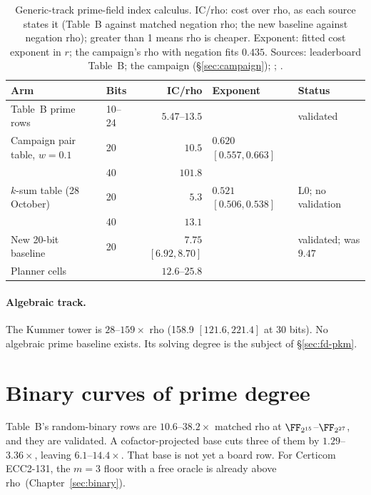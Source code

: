 \begin{table}[t]
\centering\small
\begin{tabular}{@{}llrll@{}}
\toprule
Arm & Bits & IC/rho & Exponent & Status \\
\midrule
Table~B prime rows & 10--24 & $5.47$--$13.5$ & & validated \\
\addlinespace
Campaign pair table, $w=0.1$ & 20 & $10.5$ & $0.620$ $[0.557,0.663]$ & \\
 & 40 & $101.8$ & & \\
\addlinespace
$k$-sum table (28 October) & 20 & $5.3$ & $0.521$ $[0.506,0.538]$ & L0; no validation \\
 & 40 & $13.1$ & & \\
\addlinespace
New 20-bit baseline & 20 & $7.75$ $[6.92,8.70]$ & & validated; was $9.47$ \\
\addlinespace
Planner cells & & $12.6$--$25.8$ & & \\
\bottomrule
\end{tabular}
\caption[]{Generic-track prime-field index calculus. IC/rho: cost over
rho, as each source states it (Table~B against matched negation rho; the
new baseline against negation rho); greater than 1 means rho is cheaper.
Exponent: fitted cost exponent in $r$; the campaign's rho with negation
fits $0.435$. Sources: leaderboard Table~B; the campaign
(\S\ref{sec:campaign}); ;
.}
\label{tab:distance-prime}
\end{table}

\paragraph{Algebraic track.} The Kummer tower is $28$--$159\times$ rho
(158.9 $[121.6,221.4]$ at 30 bits). No algebraic prime baseline exists.
Its solving degree is the subject of \S\ref{sec:fd-pkm}.

\section{Binary curves of prime degree}

Table~B's random-binary rows are $10.6$--$38.2\times$ matched rho at
$\FF_{2^{15}}$--$\FF_{2^{27}}$, and they are validated. A cofactor-projected
base cuts three of them by $1.29$--$3.36\times$, leaving $6.1$--$14.4\times$.
That base is not yet a board row. For Certicom ECC2-131, the $m=3$ floor
with a free oracle is already above rho~(Chapter~\ref{sec:binary}).

